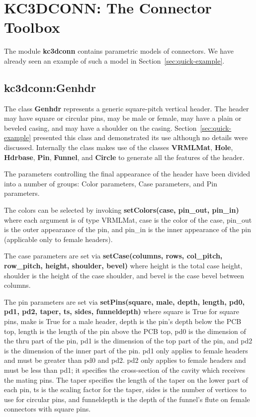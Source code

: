 \documentclass[a4paper, dvipdfm]{article}
\begin{document}
\section{KC3DCONN: The Connector Toolbox}
The module \textbf{kc3dconn} contains parametric models
of connectors.  We have already seen an example of such
a model in Section~\ref{sec:quick-example}.

\subsection{kc3dconn:Genhdr}
The class \textbf{Genhdr} represents a generic square-pitch vertical header.
The header may have square or circular pins, may be male or female, may
have a plain or beveled casing, and may have a shoulder on the casing.
Section~\ref{sec:quick-example} presented this class and demonstrated its
use although no details were discussed. Internally the class makes use of
the classes \textbf{VRMLMat}, \textbf{Hole}, \textbf{Hdrbase}, \textbf{Pin},
\textbf{Funnel}, and \textbf{Circle} to generate all the features of the
header.

The parameters controlling the final appearance of the header have been
divided into a number of groups: Color parameters, Case parameters, and
Pin parameters.

The colors can be selected by invoking \textbf{setColors(case, pin\_out, pin\_in)}
where each argument is of type VRMLMat, case is the color of the case, pin\_out is the outer
appearance of the pin, and pin\_in is the inner appearance of the pin (applicable only
to female headers).

The case parameters are set via \textbf{setCase(columns, rows, col\_pitch, row\_pitch, height, shoulder, bevel)}
where height is the total case height, shoulder is the height of the case shoulder, and bevel is the
case bevel between columns.

The pin parameters are set via \textbf{setPins(square, male, depth, length, pd0, pd1, pd2, taper, ts, sides, funneldepth)}
where square is True for square pins, make is True for a male header, depth is the pin's depth below the PCB top,
length is the length of the pin above the PCB top, pd0 is the dimension of the thru part of the pin, pd1 is the
dimension of the top part of the pin, and pd2 is the dimension of the inner part of the pin. pd1 only applies to
female headers and must be greater than pd0 and pd2. pd2 only applies to female headers and must be less than pd1;
it specifies the cross-section of the cavity which receives the mating pins. The taper specifies the length of the
taper on the lower part of each pin, ts is the scaling factor for the taper, sides is the number of vertices to
use for circular pins, and funneldepth is the depth of the funnel's flute on female connectors with square pins.
\end{document}
